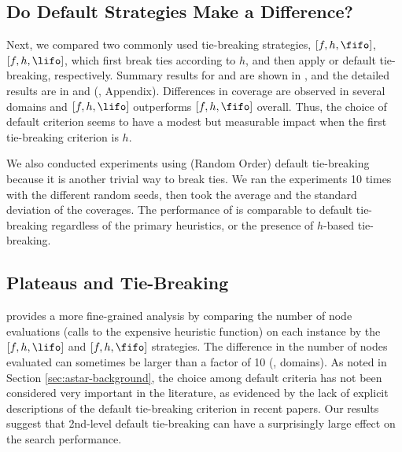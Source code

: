 

\subsection{Do Default Strategies Make a Difference?}

Next, we  compared two commonly used tie-breaking strategies, $[f,h,\fifo]$, $[f,h,\lifo]$, which
first break ties according to $h$, and then apply \fifo or \lifo
default tie-breaking, respectively.
Summary results for \lmcut and \mands are
shown in , and the detailed results are in  and  (, Appendix).
Differences in coverage are observed in several domains and $[f,h,\lifo]$ outperforms $[f,h,\fifo]$ overall. Thus, the choice of default criterion seems to have a modest but measurable impact when the first tie-breaking criterion is $h$.

We also conducted experiments using \ro (Random Order) default tie-breaking because it is another trivial way to
break ties. We ran the experiments 10 times with the different random seeds, then took the average and the
standard deviation of the coverages. The performance of \ro is comparable to \fifo default tie-breaking regardless
of the primary heuristics, or the presence of $h$-based tie-breaking.

\subsection{Plateaus and Tie-Breaking}

 provides a
more fine-grained analysis by comparing the number of node evaluations
(calls to the expensive \lmcut heuristic function) on each instance by the $[f,h,\lifo]$ and $[f,h,\fifo]$ strategies.
The difference in the number of nodes
evaluated can sometimes be larger than a factor of 10 (,  domains).
As noted in Section \ref{sec:astar-background}, the choice among default criteria has not been considered very important in the literature, as evidenced by the lack of explicit descriptions of the default tie-breaking criterion in recent papers. 
Our results suggest that 2nd-level default tie-breaking can have a surprisingly large effect on
the search performance.

